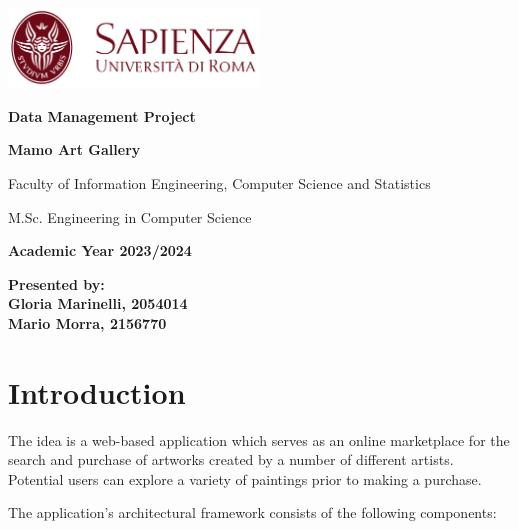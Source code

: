 \documentclass[a4paper,12pt]{article}
\begin{document}
\begin{titlepage}
      \begingroup
      \centering
      \includegraphics[width=0.5\textwidth]{sapienza.png}\par\vspace{1cm}

      {\bfseries\large Data Management Project \par}\vspace{0.5cm}

      {\bfseries\LARGE Mamo Art Gallery \par}\vspace{1cm}

      {\small Faculty of Information Engineering, Computer Science and Statistics
            \par}\vspace{0.1cm}

      {\small
            M.Sc. Engineering in Computer Science
            \par}\vspace{4cm}

      {\small
            \textbf{Academic Year 2023/2024}
            \par}\vspace{5cm}
      \endgroup

      {\textbf{\small
                  Presented by: \\
                  Gloria Marinelli, 2054014 \\
                  Mario Morra, 2156770}}\vfill

\end{titlepage}

\tableofcontents
\newpage

\section{Introduction}
\justify
The idea is a web-based application which serves as an online marketplace for the search and purchase of artworks created by a number of different artists. Potential users can explore a variety of paintings prior to making a purchase. 

The application's architectural framework consists of the following components:
\end{document}
